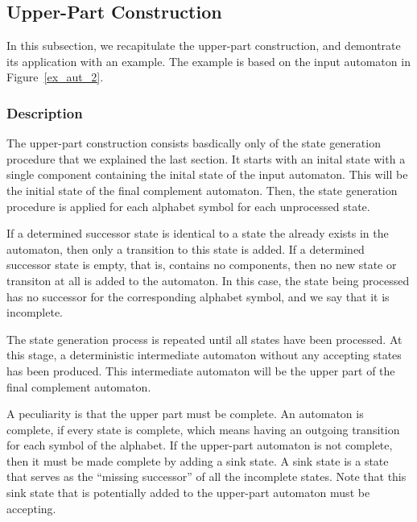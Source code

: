 

\subsection{Upper-Part Construction}
\label{3_upper_part}
In this subsection, we recapitulate the upper-part construction, and demontrate its application with an example. The example is based on the input automaton in Figure~\ref{ex_aut_2}.

\subsubsection{Description}
The upper-part construction consists basdically only of the state generation procedure that we explained the last section. It starts with an inital state with a single component containing the inital state of the input automaton. This will be the initial state of the final complement automaton. Then, the state generation procedure is applied for each alphabet symbol for each unprocessed state.

If a determined successor state is identical to a state the already exists in the automaton, then only a transition to this state is added. If a determined successor state is empty, that is, contains no components, then no new state or transiton at all is added to the automaton. In this case, the state being processed has no successor for the corresponding alphabet symbol, and we say that it is incomplete.

The state generation process is repeated until all states have been processed. At this stage, a deterministic intermediate automaton without any accepting states has been produced. This intermediate automaton will be the upper part of the final complement automaton.

A peculiarity is that the upper part must be complete. An automaton is complete, if every state is complete, which means having an outgoing transition for each symbol of the alphabet. If the upper-part automaton is not complete, then it must be made complete by adding a sink state. A sink state is a state that serves as the ``missing successor'' of all the incomplete states. Note that this sink state that is potentially added to the upper-part automaton must be accepting.

